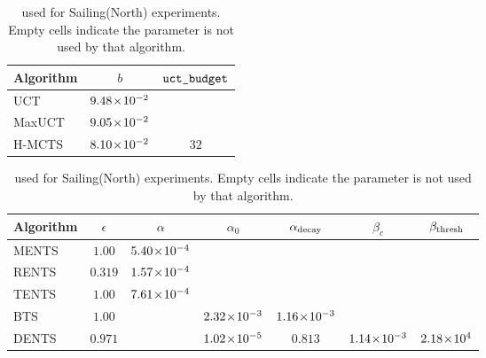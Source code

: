     \begin{table}[tbp]
        \centering
        \begin{subtable}{\textwidth}
            \centering
            \begin{tabular}{l|c|c}
                Algorithm & $b$ & ${\texttt{uct\_budget}}$ \\
                \hline
                UCT     & $9.48\!\times\!10^{-2}$ & \\
                MaxUCT  & $9.05\!\times\!10^{-2}$ & \\
                H-MCTS  & $8.10\!\times\!10^{-2}$ & $32$ \\
            \end{tabular}
            \caption{UCT-based search algorithms.}
        \end{subtable}
    
        \vspace{1em}
    
            {%
            \setlength{\tabcolsep}{4pt}%
            \fontsize{12}{14.5}\selectfont
        \begin{subtable}{\textwidth}
            \centering
            \begin{tabular}{l|c|c|c|c|c|c}
                Algorithm
                    & $\epsilon$
                    & $\alpha$
                    & $\alpha_0$
                    & ${\alpha_{\text{decay}}}$
                    & $\beta_c$
                    & ${\beta_{\text{thresh}}}$ \\
                \hline
                MENTS & $1.00$ & $5.40\!\times\!10^{-4}$ & & & & \\
                RENTS & $0.319$ & $1.57\!\times\!10^{-4}$ & & & & \\
                TENTS & $1.00$ & $7.61\!\times\!10^{-4}$ & & & & \\
                BTS   & $1.00$ & & $2.32\!\times\!10^{-3}$ & $1.16\!\times\!10^{-3}$ & & \\
                DENTS & $0.971$ & & $1.02\!\times\!10^{-5}$ & $0.813$ 
                    & $1.14\!\times\!10^{-3}$ & $2.18\!\times\!10^{4}$ \\
            \end{tabular}
            \caption{Boltzmann-based search algorithms.}
        \end{subtable}
            }
    
        \caption[ for Sailing(North) experiments.]{ used for  Sailing(North) experiments. Empty cells indicate the parameter is not used by that algorithm.}
        \label{table:sailing_north_params}
    \end{table}



